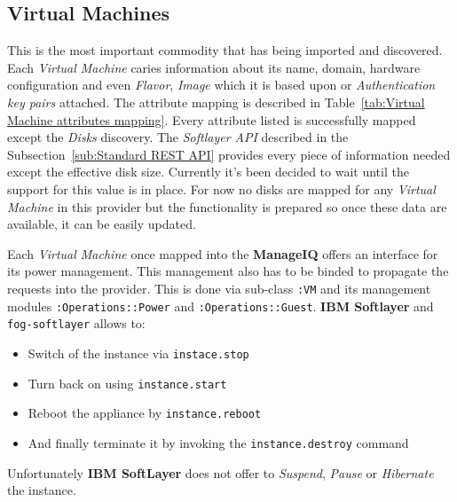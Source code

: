 \subsection{Virtual Machines}
\label{sub:Virtual Machines}

This is the most important commodity that has being imported and discovered. Each \emph{Virtual Machine} caries information about its name, domain, hardware configuration and even \emph{Flavor}, \emph{Image} which it is based upon or \emph{Authentication key pairs} attached. The attribute mapping is described in Table~\ref{tab:Virtual Machine attributes mapping}. Every attribute listed is successfully mapped except the \emph{Disks} discovery. The \emph{Softlayer API} described in the Subsection~\ref{sub:Standard REST API} provides every piece of information needed except the effective disk size. Currently it's been decided to wait until the support for this value is in place. For now no disks are mapped for any \emph{Virtual Machine} in this provider but the functionality is prepared so once these data are available, it can be easily updated.

Each \emph{Virtual Machine} once mapped into the \textbf{ManageIQ} offers an interface for its power management. This management also has to be binded to propagate the requests into the provider. This is done via sub-class \texttt{:VM} and its management modules \texttt{:Operations::Power} and \texttt{:Operations::Guest}. \textbf{IBM Softlayer} and \texttt{fog-softlayer} allows to:

\begin{itemize}
	\item Switch of the instance via \texttt{instace.stop}
	\item Turn back on using \texttt{instance.start}
	\item Reboot the appliance by \texttt{instance.reboot}
	\item And finally terminate it by invoking the \texttt{instance.destroy} command
\end{itemize}

Unfortunately \textbf{IBM SoftLayer} does not offer to \emph{Suspend}, \emph{Pause} or \emph{Hibernate} the instance.

